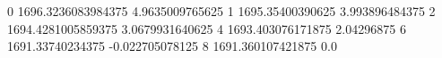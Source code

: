 0 1696.3236083984375 4.9635009765625
1 1695.35400390625 3.993896484375
2 1694.4281005859375 3.0679931640625
4 1693.403076171875 2.04296875
6 1691.33740234375 -0.022705078125
8 1691.360107421875 0.0
